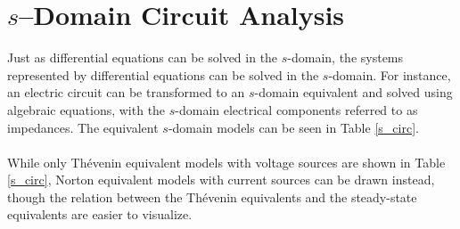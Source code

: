 \documentclass{report}
\begin{document}
\section{$s$--Domain Circuit Analysis}
Just as differential equations can be solved in the $s$-domain, the systems represented by differential equations can be solved in the $s$-domain. For instance, 
an electric circuit can be transformed to an $s$-domain equivalent and solved using algebraic equations, with the $s$-domain electrical components referred to  
as impedances. The equivalent $s$-domain models can be seen in Table \ref{s_circ}.
\\ \\
While only Thévenin equivalent models with voltage sources are shown in Table \ref{s_circ}, Norton equivalent models with current sources can be drawn instead, though the relation between the Thévenin equivalents 
and the steady-state equivalents are easier to visualize.
\end{document}
